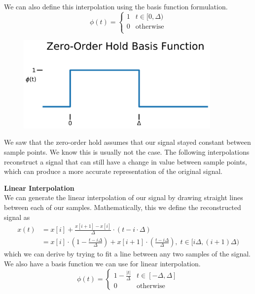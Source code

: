 We can also define this interpolation using the basis function formulation.
\begin{equation*}
    \phi(t) = 
    \begin{cases}
    1 & t \in [0, \Delta) \\
    0 & \text{otherwise} \\
    \end{cases}
\end{equation*}


\begin{figure}[H]
\centering
\includegraphics[width=10cm]{figures/zoh_basis}
\end{figure}


We saw that the zero-order hold assumes that our signal stayed constant between sample points. We know this is usually not the case. The following interpolations reconstruct a signal that can still have a change in value between sample points, which can produce a more accurate representation of the original signal.

\textbf{Linear Interpolation} \\
We can generate the linear interpolation of our signal by drawing straight lines between each of our samples.
Mathematically, this we define the reconstructed signal as
\begin{align*}
    x(t) &= x[i] + \frac{x[i + 1] - x[i]}{\Delta} \cdot (t - i \cdot \Delta) \\
    &= x[i] \cdot (1 - \frac{t - i \Delta}{\Delta}) + x[i + 1] \cdot (\frac{t - i \Delta}{\Delta}),\;t \in [i \Delta, (i + 1) \Delta)
\end{align*}
which we can derive by trying to fit a line between any two samples of the signal.
\newline
We also have a basis function we can use for linear interpolation.
\begin{equation*}
    \phi(t) = 
\begin{cases}
1 - \frac{\lvert t \rvert}{\Delta} & t \in [- \Delta, \Delta] \\
0 & \text{otherwise}
\end{cases}
\end{equation*}

